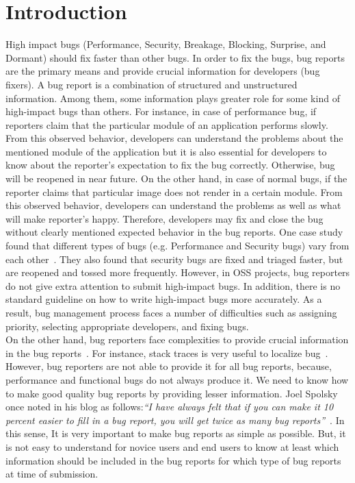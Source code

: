 \documentclass[conference]{IEEEtran}
\begin{document}
\IEEEpeerreviewmaketitle


\section{Introduction}
High impact bugs (Performance, Security, Breakage, Blocking, Surprise, and Dormant) should fix faster than other bugs. In order to fix the bugs, bug reports are the primary means and provide crucial information for developers (bug fixers). A bug report is a combination of structured and unstructured information. Among them, some information plays greater role for some kind of high-impact bugs than others. For instance, in case of performance bug, if reporters claim that the particular module of an application performs slowly. From this observed behavior, developers can understand the problems about the mentioned module of the application but it is also essential for developers to know about the reporter's expectation to fix the bug correctly. Otherwise, bug will be reopened in near future. On the other hand, in case of normal bugs, if the reporter claims that particular image does not render in a certain module. From this observed behavior, developers can understand the problems as well as what will make reporter's happy. Therefore, developers may fix and close the bug without clearly mentioned expected behavior in the bug reports. One case study found that different types of bugs (e.g. Performance and Security bugs) vary from each other~\cite{Zaman:2011}. They also found that security bugs are fixed and triaged faster, but are reopened and tossed more frequently. However, in OSS projects, bug reporters do not give extra attention to submit high-impact bugs. In addition,  there is no standard guideline on how to write high-impact bugs more accurately. As a result, bug management process faces a number of difficulties such as assigning priority, selecting appropriate developers, and fixing bugs.
\\
On the other hand, bug reporters face complexities to provide crucial information in the bug reports~\cite{Bettenburg:2008}. For instance, stack traces is very useful to localize bug~\cite{Schroter:2010}. However, bug reporters are not able to provide it for all bug reports, because, performance and functional bugs do not always  produce it. We need to know how to make good quality bug reports by providing lesser information. Joel Spolsky once noted in his blog as follows:\textit{``I have always felt that if you can make it 10 percent easier to fill in a bug report, you will get twice
as many bug reports''}~\cite{Spolsky:2000}. In this sense, It is very important to make bug reports as simple as possible. But, it is not easy to understand for novice users and end users to know at least which information should be included in the bug reports for which type of bug reports at time of submission.\\ 	 
\end{document}
